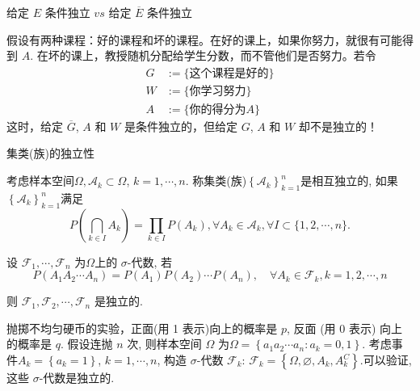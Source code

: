 \begin{frame}{给定 $E$ 条件独立 $vs$ 给定 $\overline{E}$ 条件独立}
\begin{exam}
\label{27}
假设有两种课程：好的课程和坏的课程。在好的课上，如果你努力，就很有可能得到 $A$. 在坏的课上，教授随机分配给学生分数，而不管他们是否努力。若令
\begin{align*}
	G&:= \{\mbox{这个课程是好的}\}\\
	W&:= \{\mbox{你学习努力}\}\\
	A&:=\{\mbox{你的得分为} A\}
 \end{align*}
 \pause 这时，给定 $\overline{G}$, $A$ 和 $W$ 是条件独立的，但给定 $G$, $A$ 和 $W$ 却不是独立的！

\end{exam}
\end{frame}

\begin{frame}{集类(族)的独立性}
\begin{defi}
   考虑样本空间$\Omega, \mathcal{A}_{k} \subset \Omega$, $k=1,\cdots, n$. 称集类(族)$\left\{\mathcal{A}_{k}\right\}_{k=1}^{n}$是相互独立的, 如果$\left\{\mathcal{A}_{k}\right\}_{k=1}^{n}$满足
\[
P\left(\bigcap_{k \in I} A_{k}\right)=\prod_{k \in I} P\left(A_{k}\right),  \forall A_{k} \in \mathcal{A}_{k},  \forall I \subset\{1,2, \cdots, n\}.
\]
\end{defi}
\pause

\begin{thm}
   设 \( \mathcal{F}_{1}, \cdots, \mathcal{F}_{n} \) 为\( \Omega \)上的 \( \sigma\)-代数, 若
\[
P\left(A_{1} A_{2} \cdots A_{n}\right)=P\left(A_{1}\right) P\left(A_{2}\right) \cdots P\left(A_{n}\right), \quad \forall A_{k} \in \mathcal{F}_{k}, k=1,2, \cdots, n
\]

则 \( \mathcal{F}_{1}, \mathcal{F}_{2}, \cdots, \mathcal{F}_{n} \) 是独立的.
\end{thm}

\pause

\begin{exam}
   抛掷不均匀硬币的实验，正面(用 1 表示)向上的概率是 \( p \), 反面 (用 0 表示) 向上的概率是 \( q \). 假设连抛 \( n \) 次, 则样本空间 \( \Omega \) 为$\Omega=\left\{a_{1} a_{2} \cdots a_{n}: a_{k}=0,1\right\}$. \pause 考虑事件$A_{k}=\left\{a_{k}=1\right\}$, $k=1,\cdots, n$, 构造 \( \sigma\)-代数 \( \mathcal{F}_{k} \): \pause $\mathcal{F}_{k}=\left\{\Omega, \varnothing, A_{k}, A_{k}^{C}\right\}$.\pause  可以验证, 这些 \( \sigma\)-代数是独立的.
\end{exam}


\end{frame}


